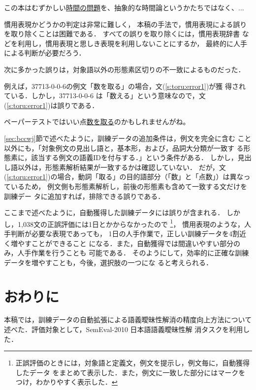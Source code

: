 \documentclass[japanese]{jnlp_1.4}
\begin{document}
\begin{exe}
\ex \label{s:toru:error3}
この本はむずかしい\ul{時間の問題}を、抽象的な時間論というかたちではなく、...
\end{exe}


慣用表現かどうかの判定は非常に難しく\cite{Hashimoto:2008j}，
本稿の手法で，慣用表現による誤りを取り除くことは困難である．
すべての誤りを取り除くには，慣用表現辞書\cite{Hashimoto:2008bj}
などを利用し，慣用表現と思しき表現を利用しないことにするか，
最終的に人手による判断が必要だろう．

次に多かった誤りは，対象語以外の形態素区切りの不一致によるものだった．

例えば，37713-0-0-6の例文「数を取る」の場合，文(\ref{s:toru:error1})が獲
得されている．しかし，37713-0-0-6 は「数える」という意味なので，文
(\ref{s:toru:error1})は誤りである．

\begin{exe}
\ex \label{s:toru:error1}
ペーパーテストではいい点\ul{数を取る}のかもしれませんがね。
\end{exe}


\ref{sec:bccwj}節で述べたように，訓練データの追加条件は，例文を完全に含む
こと以外にも，「対象例文の見出し語と，基本形，および，品詞大分類が一致す
る形態素に，該当する例文の語義IDを付与する．」という条件がある．
しかし，見出し語以外は，形態素解析結果が一致するかは確認していない．
だが，文(\ref{s:toru:error1})の場合，動詞「取る」の目的語部分（「数」と「点数」）は異なっているため，
例文側も形態素解析し，前後の形態素も含めて一致する文だけを訓練デー
タに追加すれば，排除できる誤りである．



ここまで述べたように，自動獲得した訓練データには誤りが含まれる．
しかし，1,038文の正誤評価には1日とかからなかったので
\footnote{正誤評価のときには，対象語と定義文，例文を提示し，例文毎に，自動獲得したデータ
をまとめて表示した．また，例文に一致した部分にはマークをつけ，わかりやすく表示した．}，
慣用表現のような，人手判断が必要な表現であっても，
1日の人手作業で，正しい訓練データを4割近く増やすことができること
になる．また，自動獲得では間違いやすい部分のみ，人手作業を行うことも
可能である．
そのようにして，効率的に正確な訓練データを増やすことも，今後，選択肢の一つにな
ると考えられる．


\section{おわりに} 
\label{sec:conclusion}

本稿では，訓練データの自動拡張による語義曖昧性解消の精度向上方法について
述べた．評価対象として，SemEval-2010 日本語語義曖昧性解
消タスクを利用した．
\end{document}
